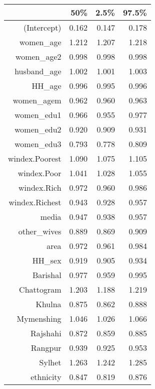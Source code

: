 \begin{table}[ht]
\centering
\begin{tabular}{rrrr}
  \hline
 & 50\% & 2.5\% & 97.5\% \\ 
  \hline
(Intercept) & 0.162 & 0.147 & 0.178 \\ 
  women\_age & 1.212 & 1.207 & 1.218 \\ 
  women\_age2 & 0.998 & 0.998 & 0.998 \\ 
  husband\_age & 1.002 & 1.001 & 1.003 \\ 
  HH\_age & 0.996 & 0.995 & 0.996 \\ 
  women\_agem & 0.962 & 0.960 & 0.963 \\ 
  women\_edu1 & 0.966 & 0.955 & 0.977 \\ 
  women\_edu2 & 0.920 & 0.909 & 0.931 \\ 
  women\_edu3 & 0.793 & 0.778 & 0.809 \\ 
  windex.Poorest & 1.090 & 1.075 & 1.105 \\ 
  windex.Poor & 1.041 & 1.028 & 1.055 \\ 
  windex.Rich & 0.972 & 0.960 & 0.986 \\ 
  windex.Richest & 0.943 & 0.928 & 0.957 \\ 
  media & 0.947 & 0.938 & 0.957 \\ 
  other\_wives & 0.889 & 0.869 & 0.909 \\ 
  area & 0.972 & 0.961 & 0.984 \\ 
  HH\_sex & 0.919 & 0.905 & 0.934 \\ 
  Barishal & 0.977 & 0.959 & 0.995 \\ 
  Chattogram & 1.203 & 1.188 & 1.219 \\ 
  Khulna & 0.875 & 0.862 & 0.888 \\ 
  Mymenshing & 1.046 & 1.026 & 1.066 \\ 
  Rajshahi & 0.872 & 0.859 & 0.885 \\ 
  Rangpur & 0.939 & 0.925 & 0.953 \\ 
  Sylhet & 1.263 & 1.242 & 1.285 \\ 
  ethnicity & 0.847 & 0.819 & 0.876 \\ 
   \hline
\end{tabular}
\end{table}
